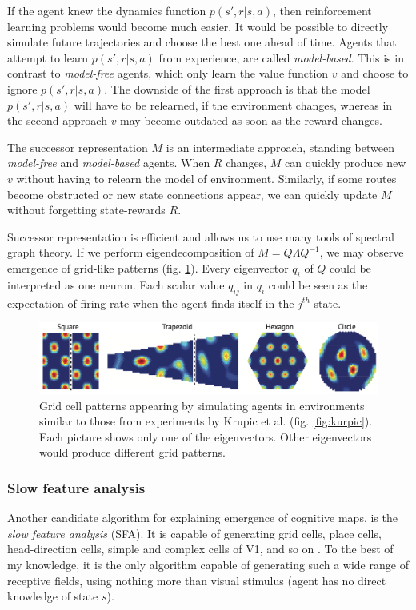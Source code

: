 \documentclass[12pt]{article}
\begin{document}
If the agent knew the dynamics function $p(s',r|s,a)$, then reinforcement learning problems would become much easier. It would be possible to directly simulate future trajectories and choose the best one ahead of time. Agents that attempt to learn $p(s',r|s,a)$ from experience, are called \textit{model-based}. This is in contrast to \textit{model-free} agents, which only learn the value function $v$ and choose to ignore $p(s',r|s,a)$. The downside of the first approach is that the model $p(s',r|s,a)$  will have to be relearned, if the environment changes, whereas in the second approach $v$ may become outdated as soon as the reward changes. 

The successor representation $M$ is an intermediate approach, standing between \textit{model-free} and \textit{model-based} agents. When $R$ changes, $M$ can quickly produce new $v$ without having to relearn the model of environment. Similarly, if some routes become obstructed or new state connections appear, we can quickly update $M$ without forgetting state-rewards $R$. 

Successor representation is efficient and allows us to use many tools of spectral graph theory. If we perform eigendecomposition of $M=Q\Lambda Q^{-1}$, we may observe emergence of grid-like patterns (fig. \ref{fig:successor_repr_sim}). Every eigenvector $q_i$ of $Q$ could be interpreted as one neuron. Each scalar value $q_{ij}$ in $q_i$ could be seen as the expectation of firing rate when the agent finds itself in the $j^{th}$ state. 
\begin{figure}[!htbp]
	\centering
	\includegraphics[width=12cm]{successor_repr_sim}
	\caption{Grid cell patterns appearing by simulating agents in environments similar to those from experiments by Krupic et al. (fig. \ref{fig:kurpic}). Each picture shows only one of the eigenvectors. Other eigenvectors would produce different grid patterns.}
	\label{fig:successor_repr_sim}
\end{figure}

\subsubsection{Slow feature analysis}

Another candidate algorithm for explaining emergence of cognitive maps, is the \textit{slow feature analysis} \cite{slow_feature_analysis} (SFA). It is capable of generating grid cells, place cells, head-direction cells, simple and complex cells of V1, and so on \cite{slowness_sparseness}. To the best of my knowledge, it is the only algorithm capable of generating such a wide range of receptive fields, using nothing more than visual stimulus (agent has no direct knowledge of state $s$). 
\end{document}
